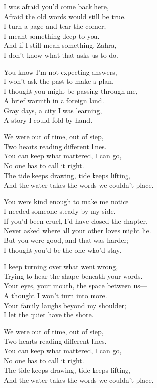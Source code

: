 \begin{lyrics}
I was afraid you'd come back here,\\
Afraid the old words would still be true.\\
I turn a page and tear the corner;\\
I meant something deep to you.\\
And if I still mean something, Zahra,\\
I don't know what that asks us to do.

You know I'm not expecting answers,\\
I won't ask the past to make a plan.\\
I thought you might be passing through me,\\
A brief warmth in a foreign land.\\
Gray days, a city I was learning,\\
A story I could fold by hand.

We were out of time, out of step,\\
Two hearts reading different lines.\\
You can keep what mattered, I can go,\\
No one has to call it right.\\
The tide keeps drawing, tide keeps lifting,\\
And the water takes the words we couldn't place.

You were kind enough to make me notice\\
I needed someone steady by my side.\\
If you'd been cruel, I'd have closed the chapter,\\
Never asked where all your other loves might lie.\\
But you were good, and that was harder;\\
I thought you'd be the one who'd stay.

I keep turning over what went wrong,\\
Trying to hear the shape beneath your words.\\
Your eyes, your mouth, the space between us—\\
A thought I won't turn into more.\\
Your family laughs beyond my shoulder;\\
I let the quiet have the shore.

We were out of time, out of step,\\
Two hearts reading different lines.\\
You can keep what mattered, I can go,\\
No one has to call it right.\\
The tide keeps drawing, tide keeps lifting,\\
And the water takes the words we couldn't place.


\end{lyrics}
